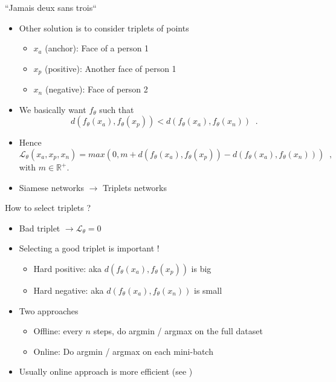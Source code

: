 \documentclass{beamer}
\begin{document}
\begin{frame}{“Jamais deux sans trois“}
\begin{itemize}
    \item Other solution is to consider triplets of points
    \begin{itemize}
        \item $x_a$ (anchor): Face of a person 1 
        \item $x_p$ (positive): Another face of person 1
        \item $x_n$ (negative): Face of person 2
    \end{itemize}
    \item We basically want $f_\theta$ such that
    \[ d(f_\theta(x_a), f_\theta(x_p))<d(f_\theta(x_a), f_\theta(x_n)) \;\;.\]
    \item Hence
    \[
    \mathcal{L}_\theta(x_a, x_p, x_n) = 
    max(0, m + d(f_\theta(x_a), f_\theta(x_p)) - d(f_\theta(x_a), f_\theta(x_n))) \;\;,
    \]
    with $m\in \mathbb{R}^+$.
    \item Siamese networks $\to$ Triplets networks
\end{itemize}
\end{frame}

\begin{frame}{How to select triplets ?}
\begin{itemize}
    \item Bad triplet $\to \mathcal{L}_\theta = 0$ 
    \item Selecting a good triplet is important !
    \begin{itemize}
        \item Hard positive: aka $d(f_\theta(x_a), f_\theta(x_p))$ is big
        \item Hard negative: aka $d(f_\theta(x_a), f_\theta(x_n))$ is small
    \end{itemize}
    \item Two approaches
        \begin{itemize}
            \item Offline: every $n$ steps, do argmin / argmax on the full dataset
            \item Online: Do argmin / argmax on each mini-batch
        \end{itemize}
    \item Usually online approach is more efficient (see \cite{schroff2015facenet})
\end{itemize}
\end{frame}
\end{document}
